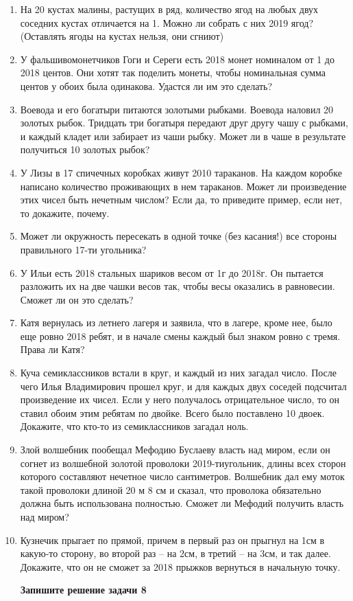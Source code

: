 \begin{enumerate}
	\item На 20 кустах малины, растущих в ряд, количество ягод на любых двух соседних кустах отличается на 1. Можно ли собрать с них 2019 ягод? (Оставлять ягоды на кустах нельзя, они сгниют)
	
	\item У фальшивомонетчиков Гоги и Сереги есть 2018 монет номиналом от 1 до 2018 центов. Они хотят так поделить монеты, чтобы номинальная сумма центов у обоих была одинакова. Удастся ли им это сделать?
	
	\item Воевода и его богатыри питаются золотыми рыбками. Воевода наловил 20 золотых рыбок. Тридцать три богатыря передают друг другу чашу с рыбками, и каждый кладет или забирает из чаши рыбку. Может ли в чаше в результате получиться 10 золотых рыбок?
	
	\item У Лизы в 17 спичечных коробках живут 2010 тараканов. На каждом коробке написано количество проживающих в нем тараканов. Может ли произведение этих чисел быть нечетным числом? Если да, то приведите пример, если нет, то докажите, почему.
	
	\item Может ли окружность пересекать в одной точке (без касания!) все стороны правильного 17-ти угольника?
	
	\item У Ильи есть 2018 стальных шариков весом от 1г до 2018г. Он пытается разложить их на две чашки весов так, чтобы весы оказались в равновесии. Сможет ли он это сделать?
	
	\item Катя вернулась из летнего лагеря и заявила, что в лагере, кроме нее, было еще ровно 2018 ребят, и в начале смены каждый был знаком ровно с тремя. Права ли Катя?
	
	\item Куча семиклассников встали в круг, и каждый из них загадал число. После чего Илья Владимирович прошел круг, и для каждых двух соседей подсчитал произведение их чисел. Если у него получалось отрицательное число, то он ставил обоим этим ребятам по двойке. Всего было поставлено 10 двоек. Докажите, что кто-то из семиклассников загадал ноль. 
	
	\item Злой волшебник пообещал Мефодию Буслаеву власть над миром, если он согнет из волшебной золотой проволоки 2019-тиугольник, длины всех сторон которого составляют нечетное число сантиметров. Волшебник дал ему моток такой проволоки длиной 20 м 8 см и сказал, что проволока обязательно должна быть использована полностью. Сможет ли Мефодий получить власть над миром?
	
	\item Кузнечик прыгает по прямой, причем в первый раз он прыгнул на 1см в какую-то сторону, во второй раз -- на 2см, в третий -- на 3см, и так далее. Докажите, что он не сможет за 2018 прыжков вернуться в начальную точку.
	
	\textbf{Запишите решение задачи  8}
	
\end{enumerate}

